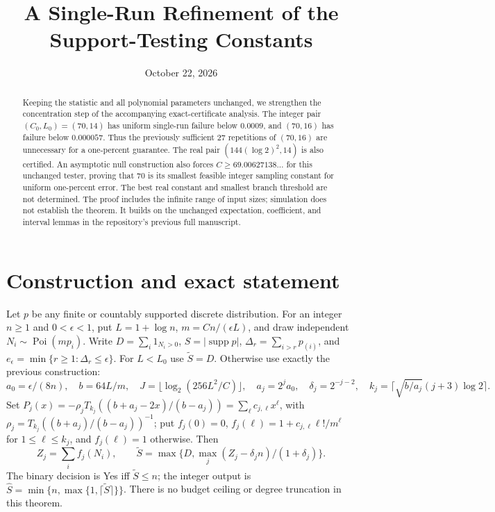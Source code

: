 \documentclass[10pt]{article}
\title{A Single-Run Refinement of the Support-Testing Constants}
\author{}\date{October 22, 2026}
\begin{document}
\maketitle
\begin{abstract}
Keeping the statistic and all polynomial parameters unchanged, we strengthen
the concentration step of the accompanying exact-certificate analysis.
The integer pair $(C_0,L_0)=(70,14)$ has uniform single-run failure below
$0.0009$, and $(70,16)$ has failure below $0.000057$.
Thus the previously sufficient 27 repetitions of $(70,16)$ are unnecessary
for a one-percent guarantee. The real pair $(144(\log2)^2,14)$ is also certified.
An asymptotic null construction also forces $C\ge69.00627138\ldots$ for
this unchanged tester, proving that 70 is its smallest feasible integer
sampling constant for uniform one-percent error. The best real constant
and smallest branch threshold are not determined.
The proof includes the infinite range of input sizes; simulation does not
establish the theorem. It builds on the unchanged expectation, coefficient,
and interval lemmas in the repository's previous full manuscript.
\end{abstract}

\section{Construction and exact statement}
Let $p$ be any finite or countably supported discrete distribution. For an
integer $n\ge1$ and $0<\epsilon<1$, put
$L=1+\log n$, $m=Cn/(\epsilon L)$, and draw independent
$N_i\sim\operatorname{Poi}(mp_i)$. Write $D=\sum_i1_{N_i>0}$,
$S=|\operatorname{supp}p|$, $\Delta_r=\sum_{i>r}p_{(i)}$, and
$e_\epsilon=\min\{r\ge1:\Delta_r\le\epsilon\}$.
For $L<L_0$ use $\widetilde S=D$. Otherwise use exactly the previous construction:
\[
 a_0=\epsilon/(8n),\quad b=64L/m,\quad
 J=\lfloor\log_2(256L^2/C)\rfloor,\quad a_j=2^ja_0,\quad
 \delta_j=2^{-j-2},\quad k_j=\lceil\sqrt{b/a_j}(j+3)\log2\rceil.
\]
Set $P_j(x)=-\rho_jT_{k_j}((b+a_j-2x)/(b-a_j))=\sum_\ell c_{j,\ell}x^\ell$,
with $\rho_j=T_{k_j}((b+a_j)/(b-a_j))^{-1}$; put $f_j(0)=0$,
$f_j(\ell)=1+c_{j,\ell}\ell!/m^\ell$ for $1\le\ell\le k_j$, and
$f_j(\ell)=1$ otherwise. Then
\[
 Z_j=\sum_i f_j(N_i),\qquad
 \widetilde S=\max\{D,\max_j(Z_j-\delta_j n)/(1+\delta_j)\}.
\]
The binary decision is Yes iff $\widetilde S\le n$; the integer output is
$\widehat S=\min\{n,\max\{1,\lceil\widetilde S\rceil\}\}$.
There is no budget ceiling or degree truncation in this theorem.
\end{document}
